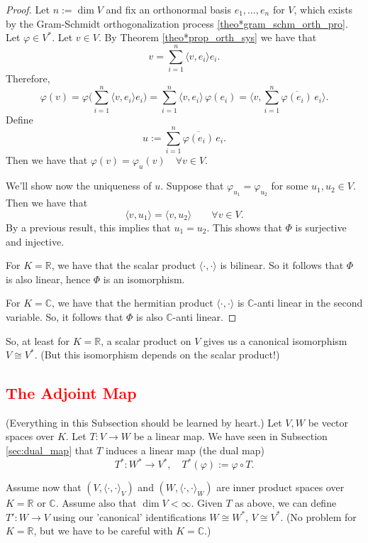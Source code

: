 \begin{proof}
	Let $n := \dim V$ and fix an orthonormal basis $e_1, \hdots , e_n$ for $V$, which exists by the Gram-Schmidt orthogonalization process \ref{theo*gram_schm_orth_pro}. Let $\varphi \in V^*$. Let $v \in V$. By Theorem \ref{theo*prop_orth_sys} we have that
	\[
		v= \sum_{i=1}^{n} \langle v, e_i \rangle e_i.
	\]
	Therefore,
	\[
		\varphi(v) = \varphi \Big(\sum_{i=1}^{n} \langle v, e_i \rangle e_i\Big) = \sum_{i=1}^{n} \langle v, e_i \rangle \, \varphi(e_i) = \langle v, \sum_{i=1}^{n} \overline{\varphi(e_i)}\, e_i \rangle.
	\]
	Define 
	\[
		u := \sum_{i=1}^{n} \overline{\varphi(e_i)}\, e_i.
	\]
	Then we have that $\varphi(v) = \varphi_u(v) \quad \forall v \in V$.
	
	We'll show now the uniqueness of $u$. Suppose that $\varphi_{u_1} = \varphi_{u_2}$ for some $u_1, u_2 \in V$. Then we have that
	\[
		\langle v, u_1 \rangle = \langle v, u_2 \rangle \qquad \forall v \in V.
	\]
	By a previous result, this implies that $u_1 = u_2$. This shows that $\Phi$ is surjective and injective.
	
	For $K = \mathbb{R}$, we have that the scalar product $\langle \cdot , \cdot \rangle$ is bilinear. So it follows that $\Phi$ is also linear, hence $\Phi$ is an isomorphism.
	
	For $K = \mathbb{C}$, we have that the hermitian product $\langle \cdot , \cdot \rangle$ is $\mathbb{C}$-anti linear in the second variable. So, it follows that $\Phi$ is also $\mathbb{C}$-anti linear.
\end{proof}
So, at least for $K = \mathbb{R}$, a scalar product on $V$ gives us a canonical isomorphism $V \cong V^{\ast}$. (But this isomorphism depends on the scalar product!)

\subsection{\textcolor{red}{The Adjoint Map}}
\label{sec:adj_map}
(Everything in this Subsection should be learned by heart.)
Let $V, W$ be vector spaces over $K$. Let $T:V \to W$ be a linear map. We have seen in Subsection \ref{sec:dual_map} that $T$ induces a linear map (the dual map) 
\[
	T^{\ast}:W^* \to V^*, \quad T^*(\varphi) := \varphi \circ T.
\]

Assume now that $(V, \langle \cdot , \cdot \rangle_V)$ and $(W, \langle \cdot , \cdot \rangle_W)$ are inner product spaces over $K = \mathbb{R}$ or $\mathbb{C}$. Assume also that \underline{$\dim V < \infty$}. Given $T$ as above, we can define $T' :W \to V$ using our 'canonical' identifications $W \cong W^*$, $V \cong V^*$. (No problem for $K = \mathbb{R}$, but we have to be careful with $K = \mathbb{C}$.)


